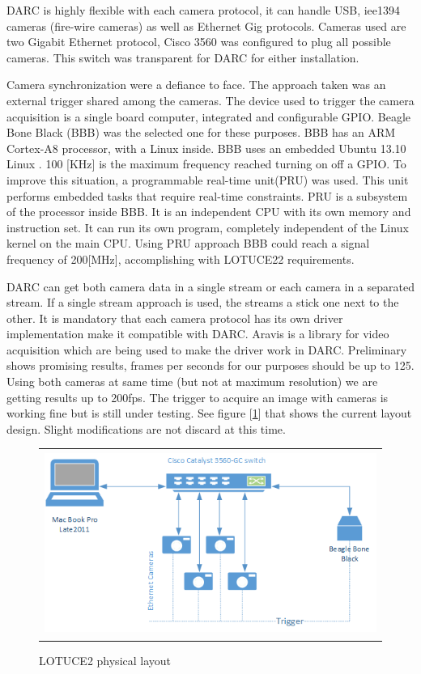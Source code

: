 \documentclass[]{spie}  %
\begin{document}
DARC is highly flexible with each camera protocol, it can handle USB, iee1394
cameras (fire-wire cameras) as well as Ethernet Gig protocols. Cameras used are
two Gigabit Ethernet protocol, Cisco 3560 was configured to plug all possible
cameras. This switch was transparent for DARC for either installation.  

Camera synchronization were a defiance to face. The approach taken was an
external trigger shared among the cameras. The device used to trigger the
camera acquisition is a single board computer, integrated and configurable
GPIO.  Beagle Bone Black (BBB) was the selected one for these purposes. BBB has
an ARM Cortex-A8 processor, with a Linux inside. BBB uses an embedded Ubuntu
13.10 Linux . 100 [KHz] is the  maximum frequency reached turning on off a
GPIO. To improve this situation, a programmable real-time unit(PRU) was used.
This unit performs embedded tasks that require real-time constraints. PRU is a
subsystem of the processor inside BBB. It is an independent CPU with its own
memory and instruction set. It can run its own program, completely independent
of the Linux kernel on the main CPU. Using PRU approach BBB could reach a
signal frequency of 200[MHz], accomplishing  with LOTUCE22 requirements.  

DARC can get both camera data in a single stream or each camera in a separated
stream. If a single stream approach is used, the streams a stick one next to
the other. It is mandatory that each camera protocol has its own driver
implementation make it compatible with DARC. Aravis is a library for video
acquisition which are being used to make the driver work in DARC. Preliminary
shows promising results, frames per seconds for our purposes should be up to
125. Using both cameras at same time (but not at maximum resolution) we are
getting results up to 200fps.  The trigger to acquire an image with cameras is
working fine but is still under testing. See figure [\ref{fig:lpl}] that shows the
current layout design. Slight modifications are not discard at this time.  
   \begin{figure}[!ht]
   \begin{center}
   \begin{tabular}{c}
   \includegraphics[height=6.0cm]{../img/physical_layout_lotuce.png}
   \end{tabular}
   \end{center}
   \caption[lpl] 
   { \label{fig:lpl} LOTUCE2 physical layout}
   \end{figure} 
\end{document}
